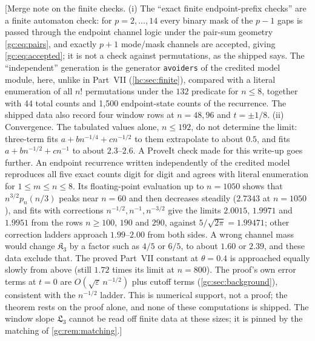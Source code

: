 \documentclass[11pt,a4paper]{article}
\theoremstyle{definition}\newaliascnt{definition}{theorem}
\theoremstyle{remark}\newaliascnt{remark}{theorem}
\begin{document}
[Merge note on the finite checks. (i) The ``exact finite endpoint-prefix
checks'' are a finite automaton check: for $p=2,\dots,14$ every binary mask of
the $p-1$ gaps is passed through the endpoint channel logic under the pair-sum
geometry \eqref{gc:eq:pairs}, and exactly $p+1$ mode/mask channels are
accepted, giving \eqref{gc:eq:accepted}; it is not a check against
permutations, as the shipped  says. The
``independent'' generation is the generator \texttt{avoiders} of the credited
model module, here, unlike in Part~VII (\cref{hc:sec:finite}), compared with a
literal enumeration of all $n!$ permutations under the $132$ predicate for
$n\le8$, together with 44 total counts and 1,500 endpoint-state counts of the
recurrence. The shipped data also record four window rows at $n=48,96$ and
$t=\pm1/8$.
(ii) Convergence. The tabulated values alone, $n\le192$, do not determine the
limit: three-term fits $a+bn^{-1/4}+cn^{-1/2}$ to them extrapolate to about
$0.5$, and fits $a+bn^{-1/2}+cn^{-1}$ to about $2.3$--$2.6$. A ProveIt check
made for this write-up goes further. An endpoint recurrence written
independently of the credited model reproduces all five exact counts digit for
digit and agrees with literal enumeration for $1\le m\le n\le8$. Its
floating-point evaluation up to $n=1050$ shows that $n^{3/2}p_n(n/3)$ peaks
near $n=60$ and then decreases steadily ($2.7343$ at $n=1050$), and fits with
corrections $n^{-1/2},n^{-1},n^{-3/2}$ give the limits $2.0015$, $1.9971$ and
$1.9951$ from the rows $n\ge100$, $190$ and $290$, against
$5/\sqrt{2\pi}=1.99471$; other correction ladders approach $1.99$--$2.00$ from
both sides. A wrong channel mass would change $\mathfrak K_3$ by a factor such
as $4/5$ or $6/5$, to about $1.60$ or $2.39$, and these data exclude that. The
proved Part~VII constant at $\theta=0.4$ is approached equally slowly from
above (still $1.72$ times its limit at $n=800$). The proof's own error terms at
$t=0$ are $O(\sqrt\varepsilon\,n^{-1/2})$ plus cutoff terms
(\cref{gc:sec:background}), consistent with the $n^{-1/2}$ ladder. This is
numerical support, not a proof; the theorem rests on the proof alone, and none
of these computations is shipped. The window slope $\mathfrak L_3$ cannot be
read off finite data at these sizes; it is pinned by the matching of
\cref{gc:rem:matching}.]
\end{document}
